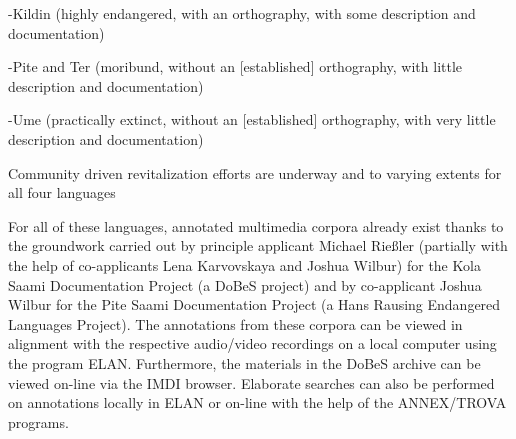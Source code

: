 \documentclass[a4paper,12pt]{article}
\begin{document}
-Kildin (highly endangered, with an orthography, with some description and documentation)

-Pite and Ter (moribund, without an [established] orthography, with little description and documentation)

-Ume (practically extinct, without an [established] orthography, with very little description and documentation)

Community driven revitalization efforts are underway and to varying extents for all four languages

For all of these languages, annotated multimedia corpora already exist thanks to the groundwork carried out by principle applicant Michael Rießler (partially with the help of co-applicants Lena Karvovskaya and Joshua Wilbur) for the Kola Saami Documentation Project (a DoBeS project) and by co-applicant Joshua Wilbur for the Pite Saami Documentation Project (a Hans Rausing Endangered Languages Project). The annotations from these corpora can be viewed in alignment with the respective audio/video recordings on a local computer using the program ELAN. Furthermore, the materials in the DoBeS archive can be viewed on-line via the IMDI browser. Elaborate searches can also be performed on annotations locally in ELAN or on-line with the help of the ANNEX/TROVA programs.
\end{document}
